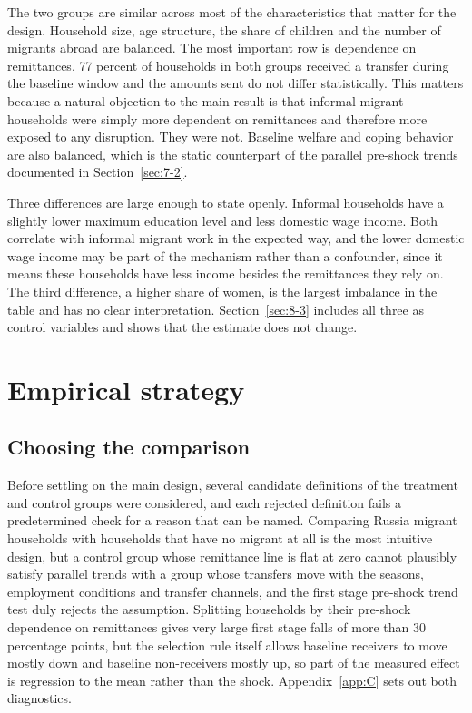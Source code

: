 The two groups are similar across most of the characteristics that matter for the design. Household size, age structure, the share of children and the number of migrants abroad are balanced. The most important row is dependence on remittances, 77 percent of households in both groups received a transfer during the baseline window and the amounts sent do not differ statistically. This matters because a natural objection to the main result is that informal migrant households were simply more dependent on remittances and therefore more exposed to any disruption. They were not. Baseline welfare and coping behavior are also balanced, which is the static counterpart of the parallel pre-shock trends documented in Section~\ref{sec:7-2}.

Three differences are large enough to state openly. Informal households have a slightly lower maximum education level and less domestic wage income. Both correlate with informal migrant work in the expected way, and the lower domestic wage income may be part of the mechanism rather than a confounder, since it means these households have less income besides the remittances they rely on. The third difference, a higher share of women, is the largest imbalance in the table and has no clear interpretation. Section~\ref{sec:8-3} includes all three as control variables and shows that the estimate does not change.

\section{Empirical strategy}\label{sec:6}

\subsection{Choosing the comparison}\label{sec:6-1}

Before settling on the main design, several candidate definitions of the treatment and control groups were considered, and each rejected definition fails a predetermined check for a reason that can be named. Comparing Russia migrant households with households that have no migrant at all is the most intuitive design, but a control group whose remittance line is flat at zero cannot plausibly satisfy parallel trends with a group whose transfers move with the seasons, employment conditions and transfer channels, and the first stage pre-shock trend test duly rejects the assumption. Splitting households by their pre-shock dependence on remittances gives very large first stage falls of more than 30 percentage points, but the selection rule itself allows baseline receivers to move mostly down and baseline non-receivers mostly up, so part of the measured effect is regression to the mean rather than the shock. Appendix~\ref{app:C} sets out both diagnostics.

